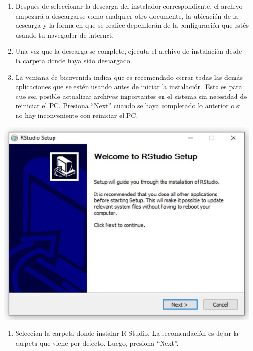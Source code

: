 \documentclass[
]{book}
\providecommand{\tightlist}{%
  \setlength{\itemsep}{0pt}\setlength{\parskip}{0pt}}
\begin{document}
\begin{enumerate}
\def\labelenumi{\arabic{enumi}.}
\setcounter{enumi}{3}
\item
  Después de seleccionar la descarga del instalador correspondiente, el archivo empezará a descargarse como cualquier otro documento, la ubicación de la descarga y la forma en que se realice dependerán de la configuración que estés usando tu navegador de internet.
\item
  Una vez que la descarga se complete, ejecuta el archivo de instalación desde la carpeta donde haya sido descargado.
\item
  La ventana de bienvenida indica que es recomendado cerrar todas las demás aplicaciones que se estén usando antes de iniciar la instalación. Esto es para que sea posible actualizar archivos importantes en el sistema sin necesidad de reiniciar el PC. Presiona ``Next'' cuando se haya completado lo anterior o si no hay inconveniente con reiniciar el PC.
\end{enumerate}

\includegraphics{data/R06.png}

\begin{enumerate}
\def\labelenumi{\arabic{enumi}.}
\setcounter{enumi}{6}
\tightlist
\item
  Seleccion la carpeta donde instalar R Studio. La recomendación es dejar la carpeta que viene por defecto. Luego, presiona ``Next''.
\end{enumerate}
\end{document}
